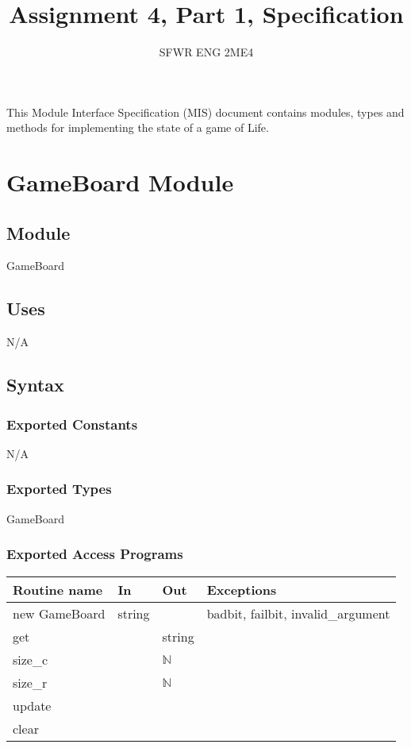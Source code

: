 \documentclass[12pt]{article}
\title{Assignment 4, Part 1, Specification}
\author{SFWR ENG 2ME4}
\begin{document}
\maketitle
This Module Interface Specification (MIS) document contains modules, types and
methods for implementing the state of a game of Life.

\newpage

\section* {GameBoard Module}

\subsection*{Module}

GameBoard

\subsection* {Uses}

N/A

\subsection* {Syntax}

\subsubsection* {Exported Constants}

N/A

\subsubsection* {Exported Types}

GameBoard

\subsubsection* {Exported Access Programs}

\begin{tabular}{| l | l | l | p{5cm} |}
\hline
\textbf{Routine name} & \textbf{In} & \textbf{Out} & \textbf{Exceptions}\\
\hline
new GameBoard & string & & badbit, failbit, invalid\_argument\\
\hline
get &  & string & \\
\hline
size\_c & & $\mathbb{N}$ & \\
\hline
size\_r & & $\mathbb{N}$ & \\
\hline
update& &  & \\
\hline
clear& &  & \\
\hline
\end{tabular}
\end{document}
